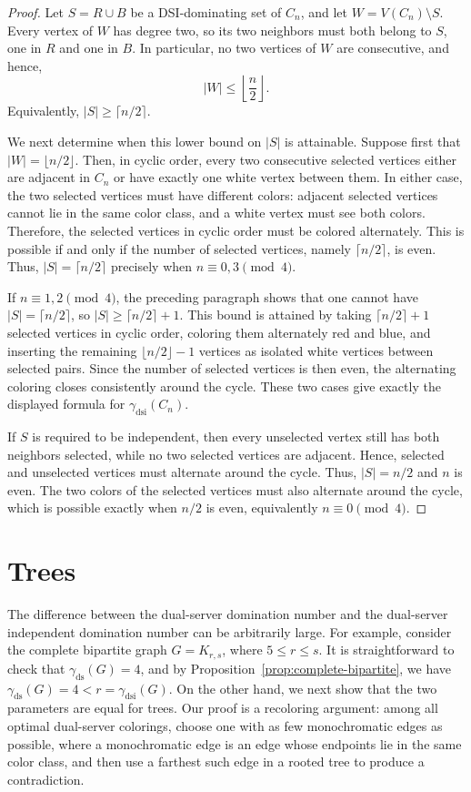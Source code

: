 \documentclass[11pt]{article}
\theoremstyle{definition}
\theoremstyle{remark}
\newcommand{\ds}{\mathrm{ds}}
\newcommand{\dsi}{\mathrm{dsi}}
\begin{document}
\begin{proof}
Let \(S=R\cup B\) be a DSI-dominating set of \(C_n\), and let
\(W=V(C_n)\setminus S\). Every vertex of \(W\) has degree two, so its two
neighbors must both belong to \(S\), one in \(R\) and one in \(B\). In
particular, no two vertices of \(W\) are consecutive, and hence,
\[
   |W|\le \left\lfloor \frac n2\right\rfloor.
\]
Equivalently, \(|S|\ge \lceil n/2\rceil\).

We next determine when this lower bound on $|S|$ is attainable. Suppose first that
\(|W|=\lfloor n/2\rfloor\). Then, in cyclic order, every two consecutive
selected vertices either are adjacent in \(C_n\) or have exactly one white
vertex between them. In either case, the two selected vertices must have
different colors: adjacent selected vertices cannot lie in the same color
class, and a white vertex must see both colors. Therefore, the selected
vertices in cyclic order must be colored alternately. This is possible if and
only if the number of selected vertices, namely \(\lceil n/2\rceil\), is
even. Thus,  \(|S|=\lceil n/2\rceil\) precisely when
\(n\equiv 0,3\pmod 4\).

If \(n\equiv 1,2\pmod 4\), the preceding paragraph shows that one cannot have
\(|S|=\lceil n/2\rceil\), so \(|S|\ge \lceil n/2\rceil+1\). This bound is
attained by taking \(\lceil n/2\rceil+1\) selected vertices in cyclic order,
coloring them alternately red and blue, and inserting the remaining
\(\lfloor n/2\rfloor-1\) vertices as isolated white vertices between selected
pairs. Since the number of selected vertices is then even, the alternating
coloring closes consistently around the cycle. These two cases give exactly
the displayed formula for \(\gamma_{\dsi}(C_n)\).

If \(S\) is required to be independent, then every unselected vertex still has
both neighbors selected, while no two selected vertices are adjacent. Hence, 
selected and unselected vertices must alternate around the cycle. Thus,
\(|S|=n/2\) and \(n\) is even. The two colors of the selected vertices must
also alternate around the cycle, which is possible exactly when \(n/2\) is
even, equivalently \(n\equiv 0\pmod 4\).
\end{proof}

\section{Trees}

The difference between the dual-server domination number and the dual-server independent domination number can be arbitrarily large.  For example, consider the complete bipartite graph $G = K_{r,s}$, where $5 \le r \le s$.  It is straightforward to check that $\gamma_{\ds}(G) = 4$, and by Proposition~\ref{prop:complete-bipartite}, we have $\gamma_{\ds}(G) = 4 < r = \gamma_{\dsi}(G)$. On the other hand, we next show that the two  parameters are equal for trees.  
Our proof  is a recoloring
argument: among all optimal dual-server colorings, choose one with as few
monochromatic edges as possible, where a monochromatic edge is an edge whose
endpoints lie in the same color class, and then use a farthest such edge in a
rooted tree to produce a contradiction.
\end{document}
